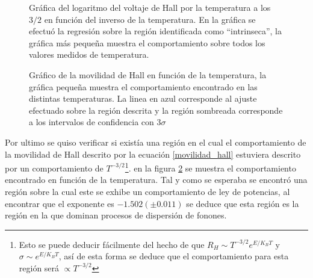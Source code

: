 \documentclass[%
 reprint,
 amsmath,amssymb,
 aps,
]{revtex4-1}
\begin{document}
\begin{figure}[h]
\caption{\label{Region intrinseca}Gráfica del logaritmo del voltaje de Hall por la temperatura a los $3/2$ en función del inverso de la temperatura. En la gráfica se efectuó la regresión  sobre la región identificada como ``intrinseca'', la gráfica más pequeña muestra el comportamiento sobre todos los valores medidos de temperatura.}
\end{figure}


\begin{figure}[h!]
\caption{\label{movilidad de Hall}Gráfico de la movilidad de Hall en función de la temperatura, la gráfica pequeña muestra el comportamiento encontrado en las distintas temperaturas. La linea en azul corresponde al ajuste efectuado sobre la región descrita y la región sombreada corresponde a los intervalos de confidencia con $3\sigma$}
\end{figure}

Por ultimo se quiso verificar si existía una región en el cual el comportamiento de la movilidad de Hall descrito por la ecuación \eqref{movilidad_hall} estuviera descrito por un comportamiento de $T^{-3/2}$\footnote{Esto se puede deducir fácilmente del hecho de que $R_H\sim T^{-3/2}e^{E/K_BT}$ y $\sigma \sim e^{E/K_BT}$, así de esta forma se deduce que el comportamiento para esta región será $\propto T^{-3/2}$}. en la figura \ref{movilidad de Hall} se muestra el comportamiento encontrado en función de la temperatura. Tal y como se esperaba se encontró una región sobre la cual este se exhibe un comportamiento de ley de potencias, al encontrar que el exponente es $-1.502 (\pm 0.011)$ se deduce que esta región es la región en la que dominan procesos de dispersión de fonones.
\end{document}
